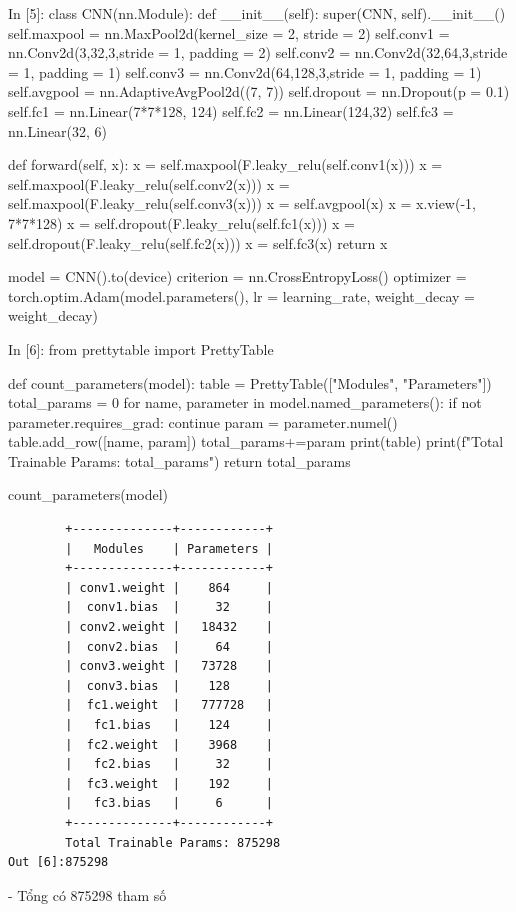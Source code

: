 \documentclass[12pt, a4paper]{article}
\begin{document}
\begin{python}
In [5]: class CNN(nn.Module):
          def __init__(self):
            super(CNN, self).__init__()
            self.maxpool = nn.MaxPool2d(kernel_size = 2, stride = 2)
            self.conv1 = nn.Conv2d(3,32,3,stride = 1, padding = 2)
            self.conv2 = nn.Conv2d(32,64,3,stride = 1, padding = 1)
            self.conv3 = nn.Conv2d(64,128,3,stride = 1, padding = 1)
            self.avgpool = nn.AdaptiveAvgPool2d((7, 7))
            self.dropout = nn.Dropout(p = 0.1)
            self.fc1 = nn.Linear(7*7*128, 124)
            self.fc2 = nn.Linear(124,32)
            self.fc3 = nn.Linear(32, 6)
            
          def forward(self, x):
            x = self.maxpool(F.leaky_relu(self.conv1(x)))
            x = self.maxpool(F.leaky_relu(self.conv2(x)))
            x = self.maxpool(F.leaky_relu(self.conv3(x)))
            x = self.avgpool(x)
            x = x.view(-1, 7*7*128)
            x = self.dropout(F.leaky_relu(self.fc1(x)))
            x = self.dropout(F.leaky_relu(self.fc2(x)))
            x = self.fc3(x)
            return x
        
        model = CNN().to(device)
        criterion = nn.CrossEntropyLoss()
        optimizer = torch.optim.Adam(model.parameters(), lr = learning_rate, weight_decay = weight_decay)
\end{python}
\newpage

\begin{python}
In [6]: from prettytable import PrettyTable
        
        def count_parameters(model):
            table = PrettyTable(["Modules", "Parameters"])
            total_params = 0
            for name, parameter in model.named_parameters():
                if not parameter.requires_grad: 
                    continue
                param = parameter.numel()
                table.add_row([name, param])
                total_params+=param
            print(table)
            print(f"Total Trainable Params: {total_params}")
            return total_params
        
        count_parameters(model)
\end{python}

\begin{verbatim}
        +--------------+------------+
        |   Modules    | Parameters |
        +--------------+------------+
        | conv1.weight |    864     |
        |  conv1.bias  |     32     |
        | conv2.weight |   18432    |
        |  conv2.bias  |     64     |
        | conv3.weight |   73728    |
        |  conv3.bias  |    128     |
        |  fc1.weight  |   777728   |
        |   fc1.bias   |    124     |
        |  fc2.weight  |    3968    |
        |   fc2.bias   |     32     |
        |  fc3.weight  |    192     |
        |   fc3.bias   |     6      |
        +--------------+------------+
        Total Trainable Params: 875298
Out [6]:875298
\end{verbatim}
\par - Tổng có 875298 tham số
\vspace{0.5 cm}
\end{document}
